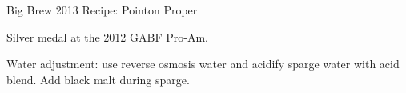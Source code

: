 \documentclass[parskip=half,fontsize=9pt,oneside]{scrbook}
\begin{document}
\mainmatter


\begin{recipe}{Big Brew 2013 Recipe: Pointon Proper}

\begin{aboutblock}
Silver medal at the 2012 GABF Pro-Am. \sourceaha
\end{aboutblock}


\begin{methodandtiming}

\begin{mashsteps}
\end{mashsteps}

\begin{fermentationsteps}
\end{fermentationsteps}

\begin{directions}
Water adjustment: use reverse osmosis water and acidify sparge water with 
acid blend. Add black malt during sparge.
\end{directions}

\end{methodandtiming}

\recipebreak

\begin{ingredientsblock}

\begin{malts}
\end{malts}

\begin{hops}
\end{hops}


\end{ingredientsblock}

\end{recipe}


\end{document}
